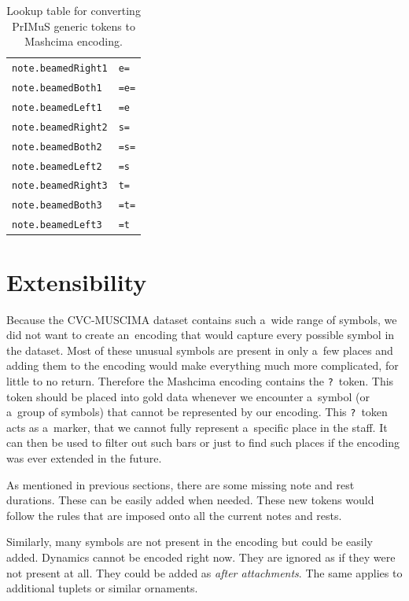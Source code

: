 \begin{table}[p]
\begin{tabular}{ll}
\midrule
\verb`note.beamedRight1` & \verb`e=` \\
\verb`note.beamedBoth1` & \verb`=e=` \\
\verb`note.beamedLeft1` & \verb`=e` \\
\midrule
\verb`note.beamedRight2` & \verb`s=` \\
\verb`note.beamedBoth2` & \verb`=s=` \\
\verb`note.beamedLeft2` & \verb`=s` \\
\midrule
\verb`note.beamedRight3` & \verb`t=` \\
\verb`note.beamedBoth3` & \verb`=t=` \\
\verb`note.beamedLeft3` & \verb`=t` \\
\bottomrule
\end{tabular}
\caption{Lookup table for converting PrIMuS generic tokens to Mashcima encoding.}
\label{tab4:TokenConversionLookup}
\end{table}

\newpage


\section{Extensibility}
\label{sec:RepresentationExtensibility}

Because the CVC-MUSCIMA dataset contains such a~wide range of symbols, we did not want to create an~encoding that would capture every possible symbol in the dataset. Most of these unusual symbols are present in only a~few places and adding them to the encoding would make everything much more complicated, for little to no return. Therefore the Mashcima encoding contains the \verb`?`~token. This token should be placed into gold data whenever we encounter a~symbol (or a~group of symbols) that cannot be represented by our encoding. This \verb`?`~token acts as a~marker, that we cannot fully represent a~specific place in the staff. It can then be used to filter out such bars or just to find such places if the encoding was ever extended in the future.

As mentioned in previous sections, there are some missing note and rest durations. These can be easily added when needed. These new tokens would follow the rules that are imposed onto all the current notes and rests.

Similarly, many symbols are not present in the encoding but could be easily added. Dynamics cannot be encoded right now. They are ignored as if they were not present at all. They could be added as \emph{after attachments}. The same applies to additional tuplets or similar ornaments.


